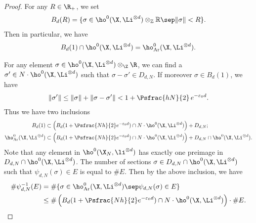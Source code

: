 \begin{proof}[Proof]
For any $R\in \R_+$, we set
\[
B_d(R)=\{ \sigma\in \ho^0(\X,\Li^{\otimes d})\otimes_{\mathbb{Z}}\mathbb{R}\sep \lVert\sigma\rVert<R\}.
\]
Then in particular, we have
\[
B_d(1)\cap \ho^0(\X,\Li^{\otimes d})=\ho^0_{\mathrm{Ar}}(\X,\Li^{\otimes d}).
\]

For any element $\sigma\in \ho^0(\X,\Li^{\otimes d})\otimes_{\Z}\R$, we can find a $\sigma'\in N\cdot\ho^0(\X,\Li^{\otimes d})$ such that $\sigma-\sigma'\in D_{d, N}$. If moreover $\sigma \in B_d(1)$, we have
\[
\lVert \sigma' \rVert \leq \lVert \sigma\rVert + \lVert \sigma-\sigma' \rVert <1+\Psfrac{hN}{2}\,e^{-\varepsilon_0 d}.
\]
Thus we have two inclusions
\begin{align*}
B_d(1)&\subset \left(B_d(1+\Psfrac{Nh}{2}e^{-\varepsilon_0 d}) \cap N\cdot \ho^0(\X,\Li^{\otimes d}) \right)+D_{d,N};\\
\ho^0_{\mathrm{Ar}}(\X,\Li^{\otimes d})&\subset \left(B_d(1+\Psfrac{Nh}{2}e^{-\varepsilon_0 d}) \cap N\cdot \ho^0(\X,\Li^{\otimes d}) \right)+D_{d,N}\cap \ho^0(\X,\Li^{\otimes d}).
\end{align*}
Note that any element in $\ho^0(\X_N,\li^{\otimes d}) $ has exactly one preimage in $D_{d,N}\cap \ho^0(\X,\Li^{\otimes d}) $. The number of sections $\sigma\in D_{d,N}\cap \ho^0(\X,\Li^{\otimes d})$ such that $\psi_{d,N}(\sigma) \in E$ is equal to $\#E$. Then by the above inclusion, we have
\begin{align*}
\#\psi_{d,N}^{-1}(E)&=\#\{ \sigma\in \ho^0_{\mathrm{Ar}}(\X,\Li^{\otimes d})\sep \psi_{d,N}(\sigma)\in E \} \\
&\leq \#\left(B_d(1+\Psfrac{Nh}{2}e^{-\varepsilon_0 d}) \cap N\cdot \ho^0(\X,\Li^{\otimes d}) \right)\cdot \#E.
\end{align*}


\end{proof}
